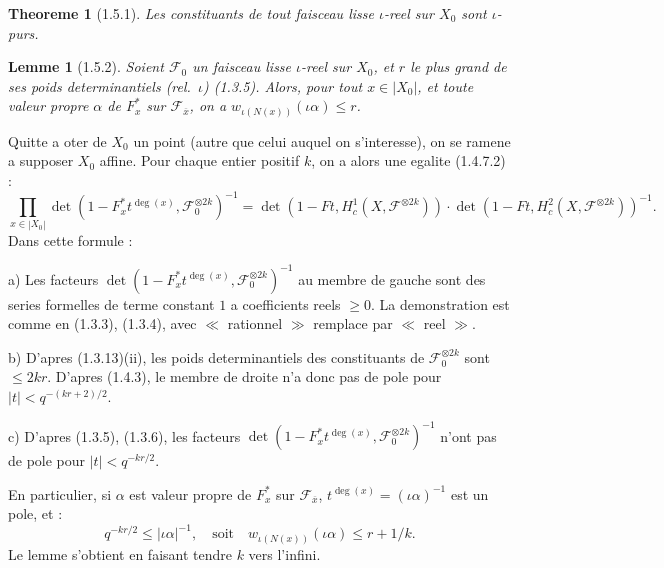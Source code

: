 \documentclass[12pt,a4paper]{article}
\theoremstyle{plain}
\newtheorem{lemme}[theorem]{Lemme}
\newtheorem{theoreme}{Theoreme}[section]
\theoremstyle{definition}
\theoremstyle{definition}
\theoremstyle{remark}
\begin{document}
\begin{theoreme}[1.5.1]
Les constituants de tout faisceau lisse $\iota$-reel sur $X_0$ sont $\iota$-purs.
\end{theoreme}

\begin{lemme}[1.5.2]
Soient $\mathscr{F}_0$ un faisceau lisse $\iota$-reel sur $X_0$, et $r$ le plus grand de ses poids determinantiels (rel.~$\iota$) (1.3.5). Alors, pour tout $x \in |X_0|$, et toute valeur propre $\alpha$ de $F_x^*$ sur $\mathscr{F}_{\overline{x}}$, on a $w_{\iota(N(x))}(\iota\alpha) \leq r$.
\end{lemme}

Quitte a oter de $X_0$ un point (autre que celui auquel on s'interesse), on se ramene a supposer $X_0$ affine. Pour chaque entier positif $k$, on a alors une egalite (1.4.7.2) :
\begin{equation}\tag{1.5.2.1}
\prod_{x \in |X_0|} \det(1 - F_x^* t^{\deg(x)}, \mathscr{F}_0^{\otimes 2k})^{-1} = \det(1 - Ft, H_c^1(X, \mathscr{F}^{\otimes 2k})) \cdot \det(1 - Ft, H_c^2(X, \mathscr{F}^{\otimes 2k}))^{-1}.
\end{equation}
Dans cette formule :

a) Les facteurs $\det(1 - F_x^* t^{\deg(x)}, \mathscr{F}_0^{\otimes 2k})^{-1}$ au membre de gauche sont des series formelles de terme constant $1$ a coefficients reels $\geq 0$. La demonstration est comme en (1.3.3), (1.3.4), avec $\ll$ rationnel $\gg$ remplace par $\ll$ reel $\gg$.

b) D'apres (1.3.13)(ii), les poids determinantiels des constituants de $\mathscr{F}_0^{\otimes 2k}$ sont $\leq 2kr$. D'apres (1.4.3), le membre de droite n'a donc pas de pole pour $|t| < q^{-(kr+2)/2}$.

c) D'apres (1.3.5), (1.3.6), les facteurs $\det(1 - F_x^* t^{\deg(x)}, \mathscr{F}_0^{\otimes 2k})^{-1}$ n'ont pas de pole pour $|t| < q^{-kr/2}$.

En particulier, si $\alpha$ est valeur propre de $F_x^*$ sur $\mathscr{F}_{\overline{x}}$, $t^{\deg(x)} = (\iota\alpha)^{-1}$ est un pole, et :
\[q^{-kr/2} \leq |\iota\alpha|^{-1}, \quad \text{soit} \quad w_{\iota(N(x))}(\iota\alpha) \leq r + 1/k.\]
Le lemme s'obtient en faisant tendre $k$ vers l'infini.
\end{document}
